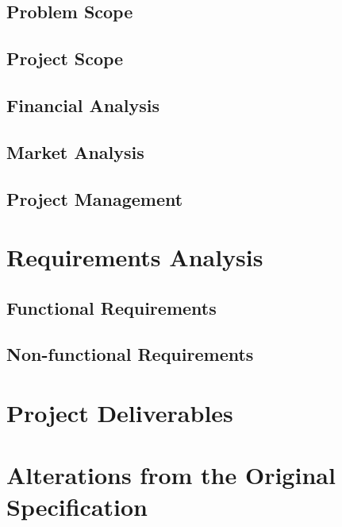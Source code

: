     \subsection{Problem Scope}
    
    \subsection{Project Scope}
    
    \subsection{Financial Analysis}
    
    \subsection{Market Analysis}
    
    \subsection{Project Management}
    
\section{Requirements Analysis}

    \subsection{Functional Requirements}
    
    
    \subsection{Non-functional Requirements}
    

\section{Project Deliverables}
    

\section{Alterations from the Original Specification}

